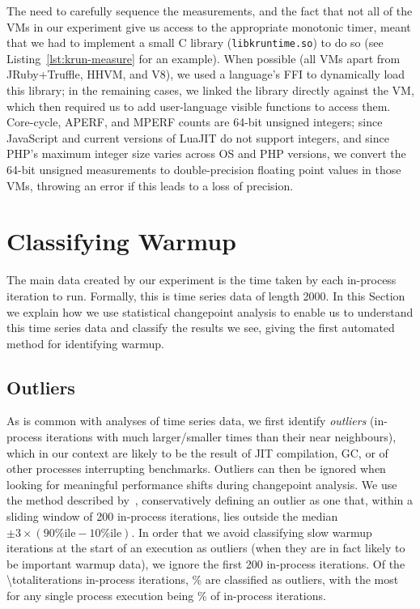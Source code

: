 \documentclass[acmsmall]{acmart}\settopmatter{printfolios=true}
\newcommand{\numiterations}{2000\xspace}
\begin{document}
The need to carefully sequence the measurements, and the fact that not all of
the VMs in our experiment give us access to the appropriate monotonic timer,
meant that we had to implement a small C library (\texttt{libkruntime.so}) to do so
(see Listing~\ref{lst:krun-measure} for an example). When possible
(all VMs apart from JRuby+Truffle, HHVM, and V8), we used a language's FFI to dynamically load this library;
in the remaining cases, we linked the library directly against the VM, which
then required us to add user-language visible functions to access them.
Core-cycle, APERF, and MPERF counts are 64-bit unsigned integers; since
JavaScript and current versions of LuaJIT do not support
integers, and since PHP's maximum integer size varies across OS and PHP versions, we
convert the 64-bit unsigned measurements to
double-precision floating point values in those VMs, throwing an error if this leads to a
loss of precision. 


\section{Classifying Warmup}
\label{sec:stats}

The main data created by our experiment is the time taken by each in-process
iteration to run. Formally, this is time series data of length \numiterations. In
this Section we explain how we use statistical changepoint analysis to enable us to
understand this time series data and classify the results we see, giving the
first automated method for identifying warmup.


\subsection{Outliers}

As is common with analyses of time series data, we first identify
\emph{outliers} (in-process iterations with much larger/smaller times than their near
neighbours), which in our context are likely to be the result of JIT compilation,
GC, or of other processes interrupting benchmarks. Outliers can then be ignored
when looking for meaningful performance shifts during changepoint analysis. We use the method described
by~\citet{tukey1977exploratory}, conservatively defining an outlier as one that, within a
sliding window of 200 in-process iterations, lies outside the median $\pm
3\times(90\%\textrm{ile} - 10\%\textrm{ile})$. In order that we avoid classifying
slow warmup iterations at the start of an execution as outliers (when they are
in fact likely to be important warmup data), we ignore the first 200 in-process
iterations. Of the \num{\totaliterations}\xspace in-process
iterations, \totaloutlierspercentage\% are classified as outliers, with the most for
%
any single process execution being \result\% of in-process iterations.
\end{document}
